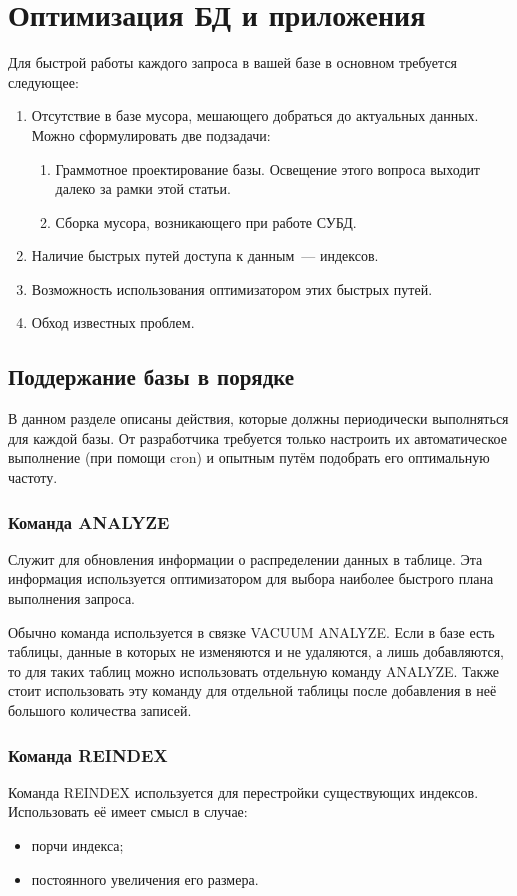 \section{Оптимизация БД и приложения}
Для быстрой работы каждого запроса в вашей базе в основном требуется следующее:
\begin{enumerate}
 \item Отсутствие в базе мусора, мешающего добраться до актуальных данных. Можно сформулировать две подзадачи:
 \begin{enumerate}
  \item Граммотное проектирование базы. Освещение этого вопроса выходит далеко за рамки этой статьи.
  \item Сборка мусора, возникающего при работе СУБД.
 \end{enumerate}
 \item Наличие быстрых путей доступа к данным~--- индексов.
 \item Возможность использования оптимизатором этих быстрых путей.
 \item Обход известных проблем.
\end{enumerate}

\subsection{Поддержание базы в порядке}
В данном разделе описаны действия, которые должны периодически выполняться для каждой базы. От разработчика требуется только настроить 
их автоматическое выполнение (при помощи cron) и опытным путём подобрать его оптимальную частоту.

\subsubsection{Команда ANALYZE}
Служит для обновления информации о распределении данных в таблице. Эта информация используется оптимизатором для выбора наиболее 
быстрого плана выполнения запроса.

Обычно команда используется в связке VACUUM ANALYZE. Если в базе есть таблицы, данные в которых не изменяются и не удаляются, а лишь 
добавляются, то для таких таблиц можно использовать отдельную команду ANALYZE. Также стоит использовать эту команду для отдельной 
таблицы после добавления в неё большого количества записей.

\subsubsection{Команда REINDEX}
Команда REINDEX используется для перестройки существующих индексов.
Использовать её имеет смысл в случае:
\begin{itemize}
\item порчи индекса;
\item постоянного увеличения его размера.
\end{itemize}

